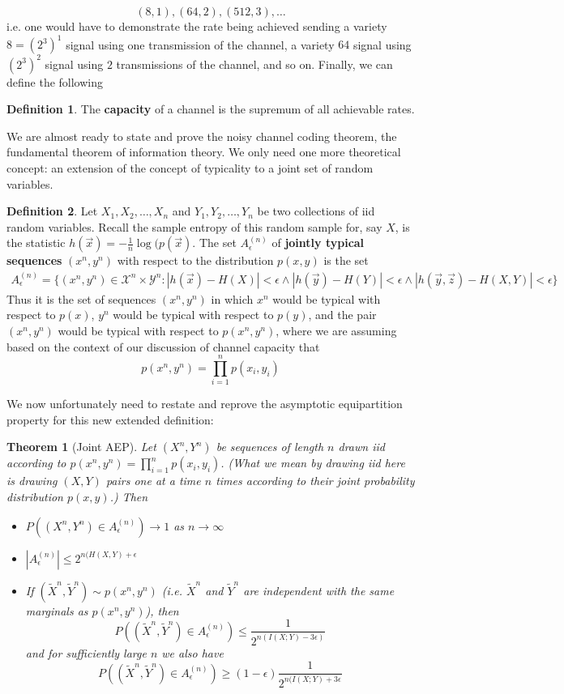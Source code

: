 \documentclass{article}
\theoremstyle{definition}
\newtheorem{definition}{Definition}[section]
\theoremstyle{plain}
\newtheorem{theorem}{Theorem}[section]
\begin{document}
\[ (8,1),(64,2),(512,3),\ldots \]
i.e. one would have to demonstrate the rate being achieved sending a variety $8 = (2^3)^1$ signal using one transmission of the channel, a variety $64$ signal using $(2^3)^2$ signal using $2$ transmissions of the channel, and so on. Finally, we can define the following 
\begin{definition}
	The \textbf{capacity} of a channel is the supremum of all achievable rates. 
\end{definition}
We are almost ready to state and prove the noisy channel coding theorem, the fundamental theorem of information theory. We only need one more theoretical concept: an extension of the concept of typicality to a joint set of random variables. 
\begin{definition}
	Let $X_1,X_2,\ldots,X_n$ and $Y_1,Y_2,\ldots,Y_n$ be two collections of iid random variables. Recall the sample entropy of this random sample for, say $X$, is the statistic $h(\vec{x}) = -\frac{1}{n}\log(p(\vec{x})$. The set $A_{\epsilon}^{(n)}$ of \textbf{jointly typical sequences} $(x^n,y^n)$ with respect to the distribution $p(x,y)$ is the set
	\begin{align}	
		A_{\epsilon}^{(n)} = \{(x^n,y^n) \in \mathcal{X}^n \times \mathcal{Y}^n: |h(\vec{x})-H(X)| < \epsilon \wedge |h(\vec{y})-H(Y)| < \epsilon \wedge |h(\vec{y},\vec{z})-H(X,Y)| < \epsilon \}
	\end{align}
	Thus it is the set of sequences $(x^n,y^n)$ in which $x^n$ would be typical with respect to $p(x)$, $y^n$ would be typical with respect to $p(y)$, and the pair $(x^n,y^n)$ would be typical with respect to $p(x^n,y^n)$, where we are assuming based on the context of our discussion of channel capacity that
	\[ p(x^n,y^n) = \prod_{i=1}^np(x_i,y_i) \]
\end{definition}
We now unfortunately need to restate and reprove the asymptotic equipartition property for this new extended definition:
\begin{theorem}[Joint AEP]
	Let $(X^n,Y^n)$ be sequences of length $n$ drawn iid according to $p(x^n,y^n) = \prod_{i=1}^np(x_i,y_i)$. (What we mean by drawing iid here is drawing $(X,Y)$ pairs one at a time $n$ times according to their joint probability distribution $p(x,y)$.) Then
	\begin{itemize}
		\item[(1)] $P((X^n,Y^n) \in A_{\epsilon}^{(n)}) \to 1$ as $n \to \infty$
		\item[(2)] $|A_{\epsilon}^{(n)}| \leq 2^{n(H(X,Y)+\epsilon}$
		\item[(3)] If $(\tilde{X}^n,\tilde{Y}^n)\sim p(x^n,y^n)$ (i.e. $\tilde{X}^n$ and $\tilde{Y}^n$ are independent with the same marginals as $p(x^n,y^n)$), then 
		\[ P\left( (\tilde{X}^n,\tilde{Y}^n) \in A_{\epsilon}^{(n)} \right) \leq \frac{1}{2^{n(I(X;Y)-3\epsilon)}} \]
		and for sufficiently large $n$ we also have
		\[ P\left( (\tilde{X}^n,\tilde{Y}^n) \in A_{\epsilon}^{(n)}\right) \geq (1-\epsilon)\frac{1}{2^{n(I(X;Y)+3\epsilon}} \]
	\end{itemize}
\end{theorem}
\end{document}
